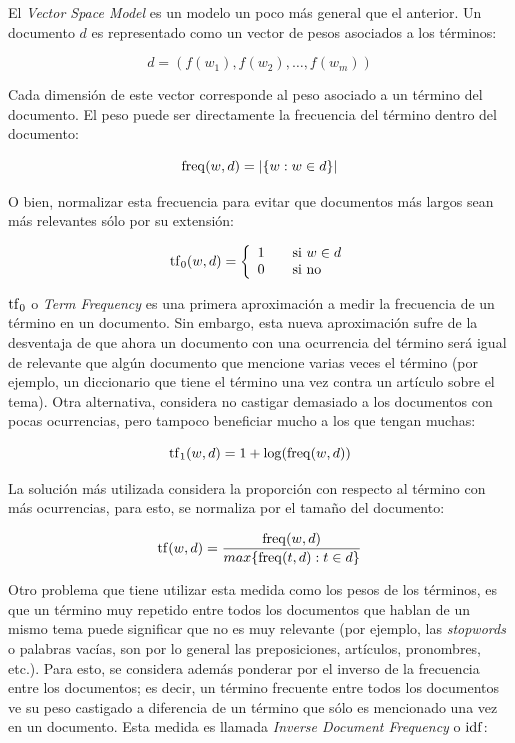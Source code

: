     El \emph{Vector Space Model} es un modelo un poco más general que el
    anterior. Un documento $d$ es representado como un vector de pesos
    asociados a los términos:

    $$d = (f(w_1), f(w_2), \ldots, f(w_m))$$

    Cada dimensión de este vector corresponde al peso asociado a un
    término del documento. El peso puede ser directamente la frecuencia del término dentro    
    del documento:

    $$\operatorname{freq}(w,d) = |\{w : w \in d\}|$$

    O bien, normalizar esta frecuencia para evitar que documentos más
    largos sean más relevantes sólo por su extensión:

    $$\operatorname{tf}_0(w,d) = \left\{
    \begin{array}{l l}
    1 & \quad \textrm{si $w \in d$}\\
    0 & \quad \textrm{si no}\\
    \end{array} \right.$$

    $\operatorname{tf}_0$ o \emph{Term Frequency} es una primera aproximación a medir la
    frecuencia de un término en un documento. Sin embargo, esta nueva
    aproximación sufre de la desventaja de que ahora un documento con
    una ocurrencia del término será igual de relevante que algún
    documento que mencione varias veces el término (por ejemplo, un
    diccionario que tiene el término una vez contra un artículo sobre
    el tema). Otra alternativa, considera no castigar demasiado a los
    documentos con pocas ocurrencias, pero tampoco beneficiar mucho a
    los que tengan muchas:

    $$\operatorname{tf}_1(w,d) = 1 + \log(\operatorname{freq}(w,d))$$

    La solución más utilizada considera la proporción con respecto al
    término con más ocurrencias, para esto, se normaliza por el tamaño
    del documento:

    $$\operatorname{tf}(w,d) = \frac{\operatorname{freq}(w,d)}{max\{\operatorname{freq}(t,d) : t \in d\}}$$

    Otro problema que tiene utilizar esta medida como los pesos de los
    términos, es que un término muy repetido entre todos los
    documentos que hablan de un mismo tema puede significar que no es
    muy relevante (por ejemplo, las \emph{stopwords} o palabras vacías, son
    por lo general las preposiciones, artículos, pronombres,
    etc.). Para esto, se considera además ponderar por el inverso de
    la frecuencia entre los documentos; es decir, un término frecuente
    entre todos los documentos ve su peso castigado a diferencia de un
    término que sólo es mencionado una vez en un documento. Esta
    medida es llamada \emph{Inverse Document Frequency} o $\operatorname{idf}$:

